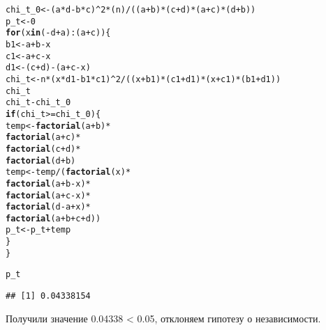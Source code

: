 \documentclass{article}\usepackage[]{graphicx}\usepackage[]{color}
\makeatletter
\newcommand{\hlnum}[1]{\textcolor[rgb]{0.686,0.059,0.569}{#1}}%
\newcommand{\hlopt}[1]{\textcolor[rgb]{0,0,0}{#1}}%
\newcommand{\hlstd}[1]{\textcolor[rgb]{0.345,0.345,0.345}{#1}}%
\newcommand{\hlkwa}[1]{\textcolor[rgb]{0.161,0.373,0.58}{\textbf{#1}}}%
\newcommand{\hlkwb}[1]{\textcolor[rgb]{0.69,0.353,0.396}{#1}}%
\newcommand{\hlkwd}[1]{\textcolor[rgb]{0.737,0.353,0.396}{\textbf{#1}}}%
\newenvironment{kframe}{%
 \def\at@end@of@kframe{}%
 \ifinner\ifhmode%
  \def\at@end@of@kframe{\end{minipage}}%
  \begin{minipage}{\columnwidth}%
 \fi\fi%
 \def\FrameCommand##1{\hskip\@totalleftmargin \hskip-\fboxsep
 \colorbox{shadecolor}{##1}\hskip-\fboxsep
     \hskip-\linewidth \hskip-\@totalleftmargin \hskip\columnwidth}%
 \MakeFramed {\advance\hsize-\width
   \@totalleftmargin\z@ \linewidth\hsize
   \@setminipage}}%
 {\par\unskip\endMakeFramed%
 \at@end@of@kframe}
\newenvironment{knitrout}{}{} %
\makeatother
\begin{document}
\begin{knitrout}
\color{fgcolor}\begin{kframe}
\begin{alltt}
\hlstd{chi_t_0} \hlkwb{<-} \hlstd{(a}\hlopt{*}\hlstd{d} \hlopt{-} \hlstd{b}\hlopt{*}\hlstd{c)}\hlopt{^}\hlnum{2} \hlopt{*} \hlstd{(n)} \hlopt{/} \hlstd{((a} \hlopt{+} \hlstd{b)}\hlopt{*}\hlstd{(c} \hlopt{+} \hlstd{d)}\hlopt{*}\hlstd{(a} \hlopt{+} \hlstd{c)}\hlopt{*}\hlstd{(d} \hlopt{+} \hlstd{b))}
\hlstd{p_t} \hlkwb{<-} \hlnum{0}
\hlkwa{for} \hlstd{(x} \hlkwa{in} \hlstd{(}\hlopt{-}\hlstd{d}\hlopt{+}\hlstd{a)}\hlopt{:}\hlstd{(a}\hlopt{+}\hlstd{c)) \{}
  \hlstd{b1} \hlkwb{<-} \hlstd{a} \hlopt{+} \hlstd{b} \hlopt{-} \hlstd{x}
  \hlstd{c1} \hlkwb{<-} \hlstd{a} \hlopt{+} \hlstd{c} \hlopt{-} \hlstd{x}
  \hlstd{d1} \hlkwb{<-} \hlstd{(c} \hlopt{+} \hlstd{d)} \hlopt{-} \hlstd{(a} \hlopt{+} \hlstd{c} \hlopt{-} \hlstd{x)}
  \hlstd{chi_t} \hlkwb{<-} \hlstd{n}\hlopt{*}\hlstd{(x} \hlopt{*} \hlstd{d1} \hlopt{-} \hlstd{b1} \hlopt{*} \hlstd{c1)}\hlopt{^}\hlnum{2} \hlopt{/} \hlstd{((x} \hlopt{+} \hlstd{b1)}\hlopt{*}\hlstd{(c1} \hlopt{+} \hlstd{d1)}\hlopt{*}\hlstd{(x} \hlopt{+} \hlstd{c1)}\hlopt{*}\hlstd{(b1} \hlopt{+} \hlstd{d1))}
  \hlstd{chi_t}
  \hlstd{chi_t} \hlopt{-} \hlstd{chi_t_0}
  \hlkwa{if} \hlstd{(chi_t} \hlopt{>=} \hlstd{chi_t_0)\{}
    \hlstd{temp} \hlkwb{<-} \hlkwd{factorial}\hlstd{(a} \hlopt{+} \hlstd{b)}\hlopt{*}
            \hlkwd{factorial}\hlstd{(a} \hlopt{+} \hlstd{c)}\hlopt{*}
            \hlkwd{factorial}\hlstd{(c} \hlopt{+} \hlstd{d)}\hlopt{*}
            \hlkwd{factorial}\hlstd{(d} \hlopt{+} \hlstd{b)}
    \hlstd{temp} \hlkwb{<-} \hlstd{temp} \hlopt{/} \hlstd{(}\hlkwd{factorial}\hlstd{(x)}\hlopt{*}
                    \hlkwd{factorial}\hlstd{(a} \hlopt{+} \hlstd{b} \hlopt{-} \hlstd{x)}\hlopt{*}
                    \hlkwd{factorial}\hlstd{(a} \hlopt{+} \hlstd{c} \hlopt{-} \hlstd{x)}\hlopt{*}
                    \hlkwd{factorial}\hlstd{(d} \hlopt{-} \hlstd{a} \hlopt{+} \hlstd{x)}\hlopt{*}
                    \hlkwd{factorial}\hlstd{(a} \hlopt{+} \hlstd{b} \hlopt{+} \hlstd{c}  \hlopt{+}\hlstd{d))}
    \hlstd{p_t} \hlkwb{<-} \hlstd{p_t} \hlopt{+} \hlstd{temp}
  \hlstd{\}}
\hlstd{\}}

\hlstd{p_t}
\end{alltt}
\begin{verbatim}
## [1] 0.04338154
\end{verbatim}
\end{kframe}
\end{knitrout}
Получили значение 0.04338 < 0.05, отклоняем гипотезу о независимости.
\end{document}
